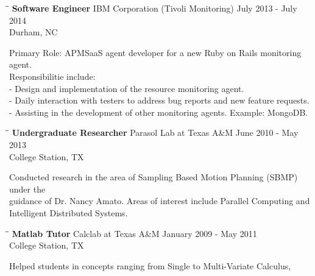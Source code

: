 \documentclass[8pt]{res}
\begin{document}
\begin{resume}
    \begin{tabbing}
      \hspace{2.3in}\= \hspace{2.6in}\= \kill %
      \textbf{Software Engineer} \>IBM Corporation (Tivoli Monitoring) \>July 2013 - July 2014\\ \>Durham, NC
    \end{tabbing}\vspace{-20pt}      %
    Primary Role: APMSaaS agent developer for a new Ruby on Rails monitoring agent.\\
    Responsibilitie include:\\
    - Design and implementation of the resource monitoring agent.\\
    - Daily interaction with testers to address bug reports and new feature requests.\\
    - Assisting in the development of other monitoring agents. Example: MongoDB.
    \begin{tabbing}
      \hspace{2.3in}\= \hspace{2.6in}\= \kill %
      \textbf{Undergraduate Researcher} \>Parasol Lab at Texas A\&M \>June 2010 - May 2013\\ \>College Station, TX
    \end{tabbing}\vspace{-20pt}      %
    Conducted research in the area of Sampling Based Motion Planning (SBMP) under the\\
    guidance of Dr. Nancy Amato.  Areas of interest include Parallel Computing and\\
    Intelligent Distributed Systems.
    \pagebreak %
    \begin{tabbing}
      \hspace{2.3in}\= \hspace{2.6in}\= \kill %
      \textbf{Matlab Tutor} \>Calclab at Texas A\&M \>January 2009 - May 2011\\ \>College Station, TX
    \end{tabbing}\vspace{-20pt}
    Helped students in concepts ranging from Single to Multi-Variate Calculus,\\

\end{resume}
\end{document}
